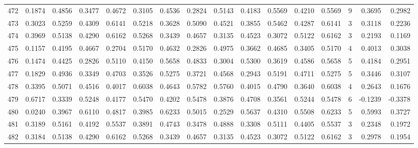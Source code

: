 \begin{tabular}{lrrrrrrrrrrrrrrr}
472 &      0.1874 &  0.4856 &  0.3477 &  0.4672 &  0.3105 &  0.4536 &  0.2824 &  0.5143 &  0.4183 &  0.5569 &   0.4210 &     0.5569 &      9 &                    0.3695 &                     0.2982 \\
473 &      0.3023 &  0.5259 &  0.4309 &  0.6141 &  0.5218 &  0.3628 &  0.5090 &  0.4521 &  0.3855 &  0.5462 &   0.4287 &     0.6141 &      3 &                    0.3118 &                     0.2236 \\
474 &      0.3969 &  0.5138 &  0.4290 &  0.6162 &  0.5268 &  0.3439 &  0.4657 &  0.3135 &  0.4523 &  0.3072 &   0.5122 &     0.6162 &      3 &                    0.2193 &                     0.1169 \\
475 &      0.1157 &  0.4195 &  0.4667 &  0.2704 &  0.5170 &  0.4632 &  0.2826 &  0.4975 &  0.3662 &  0.4685 &   0.3405 &     0.5170 &      4 &                    0.4013 &                     0.3038 \\
476 &      0.1474 &  0.4425 &  0.2826 &  0.5110 &  0.4150 &  0.5658 &  0.4833 &  0.3004 &  0.5300 &  0.3619 &   0.4586 &     0.5658 &      5 &                    0.4184 &                     0.2951 \\
477 &      0.1829 &  0.4936 &  0.3349 &  0.4703 &  0.3526 &  0.5275 &  0.3721 &  0.4568 &  0.2943 &  0.5191 &   0.4711 &     0.5275 &      5 &                    0.3446 &                     0.3107 \\
478 &      0.3395 &  0.5071 &  0.4516 &  0.4017 &  0.6038 &  0.4643 &  0.5782 &  0.5760 &  0.4015 &  0.4790 &   0.3640 &     0.6038 &      4 &                    0.2643 &                     0.1676 \\
479 &      0.6717 &  0.3339 &  0.5248 &  0.4177 &  0.5470 &  0.4202 &  0.5478 &  0.3876 &  0.4708 &  0.3561 &   0.5244 &     0.5478 &      6 &                   -0.1239 &                    -0.3378 \\
480 &      0.0240 &  0.3967 &  0.6110 &  0.4817 &  0.3985 &  0.6233 &  0.5015 &  0.2529 &  0.5637 &  0.4310 &   0.5508 &     0.6233 &      5 &                    0.5993 &                     0.3727 \\
481 &      0.3189 &  0.5161 &  0.4192 &  0.5537 &  0.3891 &  0.4743 &  0.3478 &  0.4888 &  0.3308 &  0.5111 &   0.4405 &     0.5537 &      3 &                    0.2348 &                     0.1972 \\
482 &      0.3184 &  0.5138 &  0.4290 &  0.6162 &  0.5268 &  0.3439 &  0.4657 &  0.3135 &  0.4523 &  0.3072 &   0.5122 &     0.6162 &      3 &                    0.2978 &                     0.1954 \\

\end{tabular}
